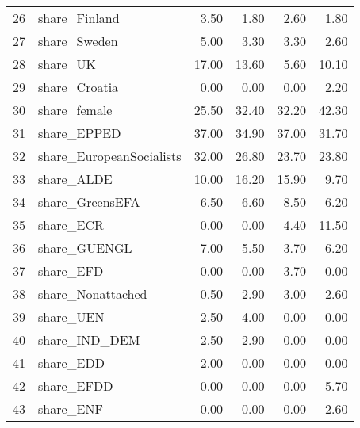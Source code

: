 \begin{table}[ht]
\begin{tabular}{rlrrrr}
  26 & share\_Finland & 3.50 & 1.80 & 2.60 & 1.80 \\ 
  27 & share\_Sweden & 5.00 & 3.30 & 3.30 & 2.60 \\ 
  28 & share\_UK & 17.00 & 13.60 & 5.60 & 10.10 \\ 
  29 & share\_Croatia & 0.00 & 0.00 & 0.00 & 2.20 \\ 
  30 & share\_female & 25.50 & 32.40 & 32.20 & 42.30 \\ 
  31 & share\_EPPED & 37.00 & 34.90 & 37.00 & 31.70 \\ 
  32 & share\_EuropeanSocialists & 32.00 & 26.80 & 23.70 & 23.80 \\ 
  33 & share\_ALDE & 10.00 & 16.20 & 15.90 & 9.70 \\ 
  34 & share\_GreensEFA & 6.50 & 6.60 & 8.50 & 6.20 \\ 
  35 & share\_ECR & 0.00 & 0.00 & 4.40 & 11.50 \\ 
  36 & share\_GUENGL & 7.00 & 5.50 & 3.70 & 6.20 \\ 
  37 & share\_EFD & 0.00 & 0.00 & 3.70 & 0.00 \\ 
  38 & share\_Nonattached & 0.50 & 2.90 & 3.00 & 2.60 \\ 
  39 & share\_UEN & 2.50 & 4.00 & 0.00 & 0.00 \\ 
  40 & share\_IND\_DEM & 2.50 & 2.90 & 0.00 & 0.00 \\ 
  41 & share\_EDD & 2.00 & 0.00 & 0.00 & 0.00 \\ 
  42 & share\_EFDD & 0.00 & 0.00 & 0.00 & 5.70 \\ 
  43 & share\_ENF & 0.00 & 0.00 & 0.00 & 2.60 \\ 
   \hline
\end{tabular}
\end{table}
